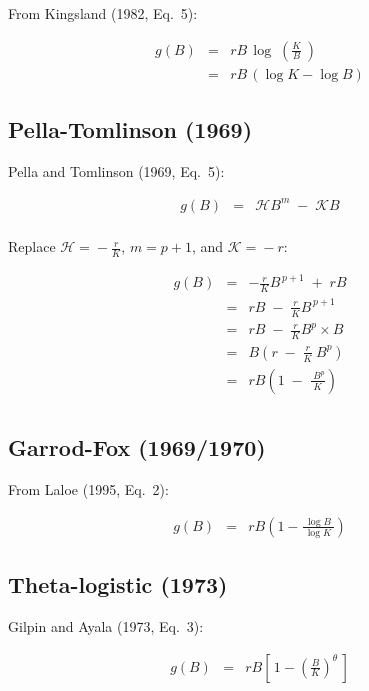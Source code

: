 \documentclass[fleqn]{article}
\begin{document}
From Kingsland (1982, Eq.~5):

\begin{eqnarray*}
  g(B) &=& rB\,\log\;\!\!\!\left(\!\frac{K}{B}\:\!\!\right)\\[1em]
  ~    &=& rB\,(\log K\!-\!\log B)
\end{eqnarray*}

\subsection{Pella-Tomlinson (1969)}

Pella and Tomlinson (1969, Eq.~5):

\begin{eqnarray*}
  g(B) &=& \mathcal{H}B^m \;-\; \mathcal{K}B\\[1ex]
\end{eqnarray*}

Replace $\mathcal{H}\!=\!-\frac{r}{K}$, $m\!=\!p\!+\!1$, and
$\mathcal{K}\!=\!-r$:

\begin{eqnarray*}
  g(B) &=& -\frac{r}{K}B^{\,p+1} \;+\; rB          \\[1em]
  ~    &=& rB \;-\; \frac{r}{K}B^{\,p+1}           \\[1em]
  ~    &=& rB \;-\; \frac{r}{K}B^p\times B         \\[1em]
  ~    &=& B\left(r \;-\; \frac{r}{K}\:\!B^p\right)\\[1em]
  ~    &=& rB\left(1 \;-\; \frac{\;B^p}{K}\right)  \\[1ex]
\end{eqnarray*}

\subsection{Garrod-Fox (1969/1970)}

From Laloe (1995, Eq.~2):

\begin{eqnarray*}
  g(B) &=& rB\left(1-\frac{\;\log B\;}{\log K}\right)
\end{eqnarray*}

\subsection{Theta-logistic (1973)}

Gilpin and Ayala (1973, Eq.~3):

\begin{eqnarray*}
  g(B) &=& rB\!\left[\,1\!-\!\left(\frac{B}{K}\right)^\theta\,\right]\\[1ex]
\end{eqnarray*}
\end{document}
